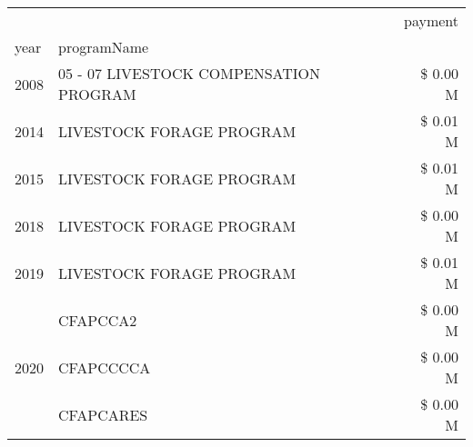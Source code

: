 \begin{tabular}{llr}
\toprule
 &  & payment \\
year & programName &  \\
\midrule
2008 & 05 - 07 LIVESTOCK COMPENSATION PROGRAM & \$ 0.00 M \\
\cline{1-3}
2014 & LIVESTOCK FORAGE PROGRAM & \$ 0.01 M \\
\cline{1-3}
2015 & LIVESTOCK FORAGE PROGRAM & \$ 0.01 M \\
\cline{1-3}
2018 & LIVESTOCK FORAGE PROGRAM & \$ 0.00 M \\
\cline{1-3}
2019 & LIVESTOCK FORAGE PROGRAM & \$ 0.01 M \\
\cline{1-3}
\multirow[t]{3}{*}{2020} & CFAPCCA2 & \$ 0.00 M \\
 & CFAPCCCCA & \$ 0.00 M \\
 & CFAPCARES & \$ 0.00 M \\
\cline{1-3}
\bottomrule
\end{tabular}

